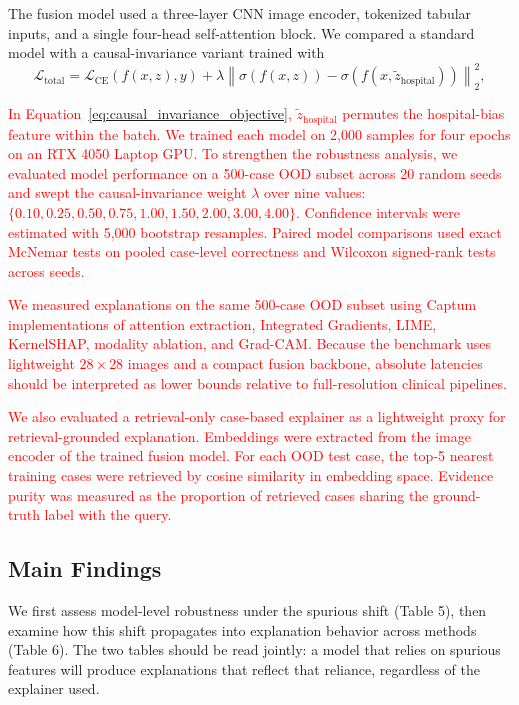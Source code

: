 \documentclass[pdflatex,sn-mathphys-num]{sn-jnl}%
\theoremstyle{thmstyleone}%
\theoremstyle{thmstyletwo}%
\theoremstyle{thmstylethree}%
\begin{document}
\begin{itemize}
The fusion model used a three-layer CNN image encoder, tokenized tabular inputs, and a single four-head self-attention block. We compared a standard model with a causal-invariance variant trained with
\begin{equation}
\mathcal{L}_{\text{total}} = \mathcal{L}_{\text{CE}}(f(x,z), y) + \lambda \left\| \sigma(f(x,z)) - \sigma(f(x,\tilde{z}_{\text{hospital}})) \right\|_2^2,
\label{eq:causal_invariance_objective}
\end{equation}

\textcolor{red}{In Equation~\eqref{eq:causal_invariance_objective}, $\tilde{z}_{\text{hospital}}$ permutes the hospital-bias feature within the batch. We trained each model on 2,000 samples for four epochs on an RTX 4050 Laptop GPU. To strengthen the robustness analysis, we evaluated model performance on a 500-case OOD subset across 20 random seeds and swept the causal-invariance weight $\lambda$ over nine values: $\{0.10, 0.25, 0.50, 0.75, 1.00, 1.50, 2.00, 3.00, 4.00\}$. Confidence intervals were estimated with 5,000 bootstrap resamples. Paired model comparisons used exact McNemar tests on pooled case-level correctness and Wilcoxon signed-rank tests across seeds.}

\textcolor{red}{We measured explanations on the same 500-case OOD subset using Captum implementations of attention extraction, Integrated Gradients, LIME, KernelSHAP, modality ablation, and Grad-CAM. Because the benchmark uses lightweight $28 \times 28$ images and a compact fusion backbone, absolute latencies should be interpreted as lower bounds relative to full-resolution clinical pipelines.}

\textcolor{red}{We also evaluated a retrieval-only case-based explainer as a lightweight proxy for retrieval-grounded explanation. Embeddings were extracted from the image encoder of the trained fusion model. For each OOD test case, the top-5 nearest training cases were retrieved by cosine similarity in embedding space. Evidence purity was measured as the proportion of retrieved cases sharing the ground-truth label with the query.}
\subsection{Main Findings}
We first assess model-level robustness under the spurious shift (Table 5), then examine how this shift propagates into explanation behavior across methods (Table 6). The two tables should be read jointly: a model that relies on spurious features will produce explanations that reflect that reliance, regardless of the explainer used.


\end{itemize}
\end{document}
